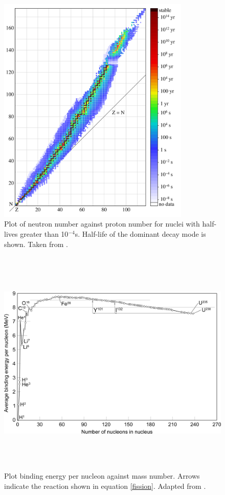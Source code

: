 \begin{figure}[htp]
\centering
\includegraphics[height=11cm]{images/Isotopes_and_half-life.png}
\caption{Plot of neutron number against proton number for nuclei with half-lives greater than 10${^{-4}}$s. Half-life of the dominant decay mode is shown. Taken from \cite{BenRG}.}
\label{figure:NZcurve}
\end{figure}

\begin{figure}[htp]
\centering
\includegraphics[height=11cm]{images/Binding_energy_curve.png}
\caption{Plot binding energy per nucleon against mass number. Arrows indicate the reaction shown in equation \ref{fission}. Adapted from \cite{Fastfission}.}
\label{figure:bindingenergy}
\end{figure}


